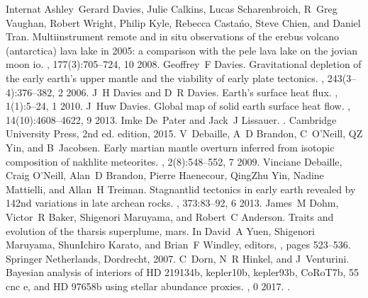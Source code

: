 \documentclass[letterpaper,10pt,english]{jupyterBook}
\begin{document}
\begin{sphinxthebibliography}{Internat}
\sphinxAtStartPar
Ashley Gerard Davies, Julie Calkins, Lucas Scharenbroich, R Greg Vaughan, Robert Wright, Philip Kyle, Rebecca Castańo, Steve Chien, and Daniel Tran. Multi\sphinxhyphen{}instrument remote and in situ observations of the erebus volcano (antarctica) lava lake in 2005: a comparison with the pele lava lake on the jovian moon io. , 177(3):705–724, 10 2008.
\sphinxAtStartPar
Geoffrey F Davies. Gravitational depletion of the early earth's upper mantle and the viability of early plate tectonics. , 243(3–4):376–382, 2 2006.
\sphinxAtStartPar
J H Davies and D R Davies. Earth's surface heat flux. , 1(1):5–24, 1 2010.
\sphinxAtStartPar
J Huw Davies. Global map of solid earth surface heat flow. , 14(10):4608–4622, 9 2013.
\sphinxAtStartPar
Imke De Pater and Jack J Lissauer. . Cambridge University Press, 2nd ed. edition, 2015.
\sphinxAtStartPar
V Debaille, A D Brandon, C O'Neill, Q\sphinxhyphen{}Z Yin, and B Jacobsen. Early martian mantle overturn inferred from isotopic composition of nakhlite meteorites. , 2(8):548–552, 7 2009.
\sphinxAtStartPar
Vinciane Debaille, Craig O'Neill, Alan D Brandon, Pierre Haenecour, Qing\sphinxhyphen{}Zhu Yin, Nadine Mattielli, and Allan H Treiman. Stagnant\sphinxhyphen{}lid tectonics in early earth revealed by 142nd variations in late archean rocks. , 373:83–92, 6 2013.
\sphinxAtStartPar
James M Dohm, Victor R Baker, Shigenori Maruyama, and Robert C Anderson. Traits and evolution of the tharsis superplume, mars. In David A Yuen, Shigenori Maruyama, Shun\sphinxhyphen{}Ichiro Karato, and Brian F Windley, editors, , pages 523–536. Springer Netherlands, Dordrecht, 2007.
\sphinxAtStartPar
C Dorn, N R Hinkel, and J Venturini. Bayesian analysis of interiors of HD 219134b, kepler\sphinxhyphen{}10b, kepler\sphinxhyphen{}93b, CoRoT\sphinxhyphen{}7b, 55 cnc e, and HD 97658b using stellar abundance proxies. , 0 2017. .

\end{sphinxthebibliography}
\end{document}
